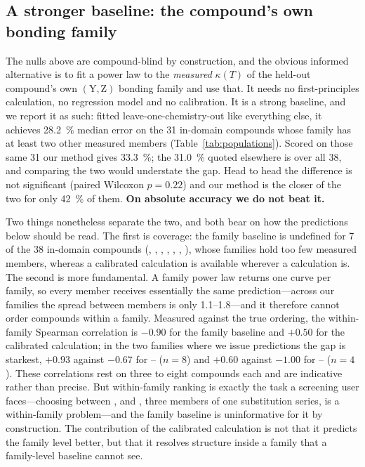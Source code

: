 \subsection{A stronger baseline: the compound's own bonding family}
\label{sec:familynull}

The nulls above are compound-blind by construction, and the obvious informed alternative is to fit
a power law to the \emph{measured} $\kappa(T)$ of the held-out compound's own
$(\mathrm{Y},\mathrm{Z})$ bonding family and use that. It needs no first-principles calculation, no
regression model and no calibration. It is a strong baseline, and we report it as such: fitted
leave-one-chemistry-out like everything else, it achieves \SI{28.2}{\percent} median error on the
\num{31} in-domain compounds whose family has at least two other measured members
(Table~\ref{tab:populations}). Scored on those same \num{31} our method gives \SI{33.3}{\percent};
the \SI{31.0}{\percent} quoted elsewhere is over all \num{38}, and comparing the two would
understate the gap. Head to
head the difference is not significant (paired Wilcoxon $p=\num{0.22}$) and our method is the closer
of the two for only \SI{42}{\percent} of them. \textbf{On absolute accuracy we do not beat it.}

Two things nonetheless separate the two, and both bear on how the predictions below should be read.
The first is coverage: the family baseline is undefined for \num{7} of the \num{38} in-domain
compounds (, , , , , ,
), whose families hold too few measured members, whereas a calibrated calculation is
available wherever a calculation is. The second is more fundamental. A family power law returns one
curve per family, so every member receives essentially the same prediction---across our families
the spread between members is only \numrange{1.1}{1.8}---and it therefore cannot order compounds
within a family. Measured against the true ordering, the within-family Spearman correlation is
$-0.90$ for the family baseline and $+0.50$ for the calibrated calculation; in the two families
where we issue predictions the gap is starkest, $+0.93$ against $-0.67$ for --
($n=8$) and $+0.60$ against $-1.00$ for -- ($n=4$). These correlations rest on three
to eight compounds each and are indicative rather than precise. But within-family ranking is
exactly the task a screening user faces---choosing between ,  and
, three members of one substitution series, is a within-family problem---and the family
baseline is uninformative for it by construction. The contribution of the calibrated calculation is
not that it predicts the family level better, but that it resolves structure inside a family that a
family-level baseline cannot see.

